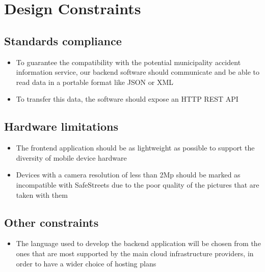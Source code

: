 \section{Design Constraints}

\subsection{Standards compliance}
  \begin{itemize}
    \item To guarantee the compatibility with the potential municipality accident information service, our backend software should communicate and be able to read data in a portable format like JSON or XML
    \item To transfer this data, the software should expose an HTTP REST API
  \end{itemize}

\subsection{Hardware limitations}
  \begin{itemize}
    \item The frontend application should be as lightweight as possible to support the diversity of mobile device hardware
    \item Devices with a camera resolution of less than 2Mp should be marked as incompatible with SafeStreets due to the poor quality of the pictures that are taken with them
  \end{itemize}

\subsection{Other constraints}
  \begin{itemize}
    \item The language used to develop the backend application will be chosen from the ones that are most supported by the main cloud infrastructure providers, in order to have a wider choice of hosting plans
  \end{itemize}